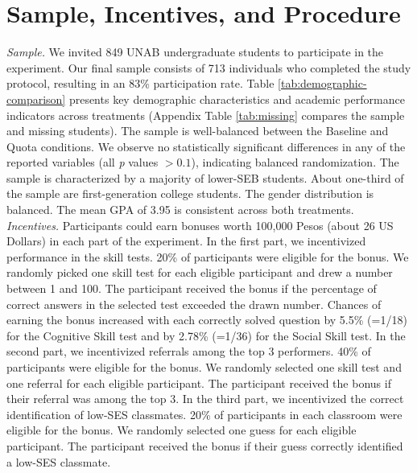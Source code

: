 \documentclass[11pt,a4paper,oneside]{article}
\begin{document}
\section{Sample, Incentives, and Procedure}
\textit{Sample.} We invited 849 UNAB undergraduate students to participate in the experiment. Our final sample consists of 713 individuals who completed the study protocol, resulting in an 83\% participation rate. Table \ref{tab:demographic-comparison} presents key demographic characteristics and academic performance indicators across treatments (Appendix Table \ref{tab:missing} compares the sample and missing students). The sample is well-balanced between the Baseline and Quota conditions. We observe no statistically significant differences in any of the reported variables (all \textit{p} values $> 0.1$), indicating balanced randomization. The sample is characterized by a majority of lower-SEB students. About one-third of the sample are first-generation college students. The gender distribution is balanced. The mean GPA of 3.95 is consistent across both treatments. \medskip\\ 
\textit{Incentives.} 
Participants could earn bonuses worth 100,000 Pesos (about 26 US Dollars) in each part of the experiment. In the first part, we incentivized performance in the skill tests. 20\% of participants were eligible for the bonus. We randomly picked one skill test for each eligible participant and drew a number between 1 and 100. The participant received the bonus if the percentage of correct answers in the selected test exceeded the drawn number. Chances of earning the bonus increased with each correctly solved question by 5.5\% (=1/18) for the Cognitive Skill test and by 2.78\% (=1/36) for the Social Skill test. In the second part, we incentivized referrals among the top 3 performers. 40\% of participants were eligible for the bonus. We randomly selected one skill test and one referral for each eligible participant. The participant received the bonus if their referral was among the top 3. In the third part, we incentivized the correct identification of low-SES classmates. 20\% of participants in each classroom were eligible for the bonus. We randomly selected one guess for each eligible participant. The participant received the bonus if their guess correctly identified a low-SES classmate.\medskip\\
\end{document}
